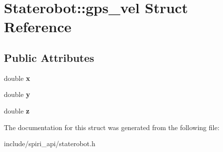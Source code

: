 \hypertarget{struct_staterobot_1_1gps__vel}{\section{\-Staterobot\-:\-:gps\-\_\-vel \-Struct \-Reference}
\label{struct_staterobot_1_1gps__vel}
}
\subsection*{\-Public \-Attributes}
\begin{DoxyCompactItemize}
\item 
\hypertarget{struct_staterobot_1_1gps__vel_ae842af95ba1ce68a08f185f8b6e85a09}{double {\bfseries x}}\label{struct_staterobot_1_1gps__vel_ae842af95ba1ce68a08f185f8b6e85a09}

\item 
\hypertarget{struct_staterobot_1_1gps__vel_a022a4d4290febab592d1ac095e63442d}{double {\bfseries y}}\label{struct_staterobot_1_1gps__vel_a022a4d4290febab592d1ac095e63442d}

\item 
\hypertarget{struct_staterobot_1_1gps__vel_ab118539edebb39653026303fff77367a}{double {\bfseries z}}\label{struct_staterobot_1_1gps__vel_ab118539edebb39653026303fff77367a}

\end{DoxyCompactItemize}


\-The documentation for this struct was generated from the following file\-:\begin{DoxyCompactItemize}
\item 
include/spiri\-\_\-api/staterobot.\-h\end{DoxyCompactItemize}
